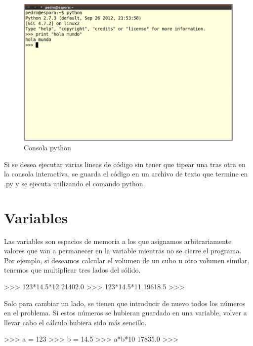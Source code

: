 \begin{figure}[ht!]
   \centering
   \includegraphics[scale=0.2]{imagenes/consola_python.png}
   \caption{Consola python}\label{graf:consola_python}
\end{figure}


\newpage

Si se desea ejecutar varias lineas de código sin tener que tipear una tras otra en la consola interactiva, se guarda el código en un archivo de texto que termine en .py y se ejecuta utilizando el comando python.

\section{Variables}

Las variables son espacios de memoria a los que asignamos arbitrariamente valores que van a permanecer en la variable mientras no se cierre el programa. Por ejemplo, si deseamos calcular el volumen de un cubo u otro volumen similar, tenemos que multiplicar tres lados del sólido.\\

\begin{pyglist} [language=python]
>>> 123*14.5*12
21402.0
>>> 123*14.5*11
19618.5
>>> 
\end{pyglist}

Solo para cambiar un lado, se tienen que introducir de nuevo todos los números en el problema. Si estos números se hubieran guardado en una variable, volver a llevar cabo el cálculo hubiera sido más sencillo.\\

\begin{pyglist} [language=python]
>>> a = 123
>>> b = 14.5
>>> a*b*10
17835.0
>>> 
\end{pyglist}

